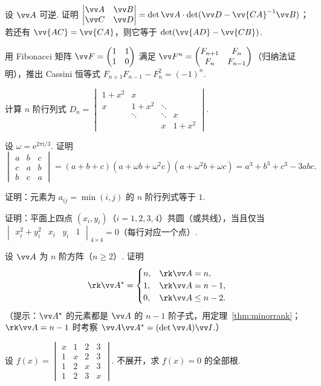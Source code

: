 {\begin{exB}
			\item\label{ex:det:B9} 设 $\vv A$ 可逆. 证明 $\begin{vmatrix}\vv A&\vv B\\ \vv C&\vv D\end{vmatrix}=\det\vv A\cdot\det(\vv D-\vv{CA}^{-1}\vv B)$；若还有 $\vv{AC}=\vv{CA}$，则它等于 $\det(\vv{AD}-\vv{CB})$.
			\item\label{ex:det:B10} 用 Fibonacci 矩阵 $\vv F=\begin{pmatrix}1&1\\1&0\end{pmatrix}$ 满足 $\vv F^n=\begin{pmatrix}F_{n+1}&F_n\\F_n&F_{n-1}\end{pmatrix}$（归纳法证明），推出 Cassini 恒等式 $F_{n+1}F_{n-1}-F_n^2=(-1)^n$.
			\item\label{ex:det:B11} 计算 $n$ 阶行列式 $D_n=\begin{vmatrix}1+x^2&x&&\\x&1+x^2&\ddots&\\&\ddots&\ddots&x\\&&x&1+x^2\end{vmatrix}$.
			\item\label{ex:det:B12} 设 $\omega=\mathrm e^{2\pi\mathrm i/3}$. 证明
			\[\begin{vmatrix}a&b&c\\c&a&b\\b&c&a\end{vmatrix}=(a+b+c)(a+\omega b+\omega^2c)(a+\omega^2b+\omega c)=a^3+b^3+c^3-3abc.\]
			\item\label{ex:det:B13} 证明：元素为 $a_{ij}=\min(i,j)$ 的 $n$ 阶行列式等于 $1$.
			\item\label{ex:det:B14} 证明：平面上四点 $(x_i,y_i)$（$i=1,2,3,4$）共圆（或共线），当且仅当 $\begin{vmatrix}x_i^2+y_i^2&x_i&y_i&1\end{vmatrix}_{4\times4}=0$（每行对应一个点）.
						\item\label{ex:det:B15} 设 $\vv A$ 为 $n$ 阶方阵（$n\ge2$）. 证明
			\[\rk\vv A^*=\begin{cases}n,&\rk\vv A=n,\\1,&\rk\vv A=n-1,\\0,&\rk\vv A\le n-2.\end{cases}\]
			（提示：$\vv A^*$ 的元素都是 $\vv A$ 的 $n-1$ 阶子式，用定理~\ref{thm:minorrank}；$\rk\vv A=n-1$ 时考察 $\vv A\vv A^*=(\det\vv A)\vv I$.）
			\item\label{ex:det:B16} 设 $f(x)=\begin{vmatrix}x&1&2&3\\1&x&2&3\\1&2&x&3\\1&2&3&x\end{vmatrix}$. 不展开，求 $f(x)=0$ 的全部根.
		\end{exB}
		
}

